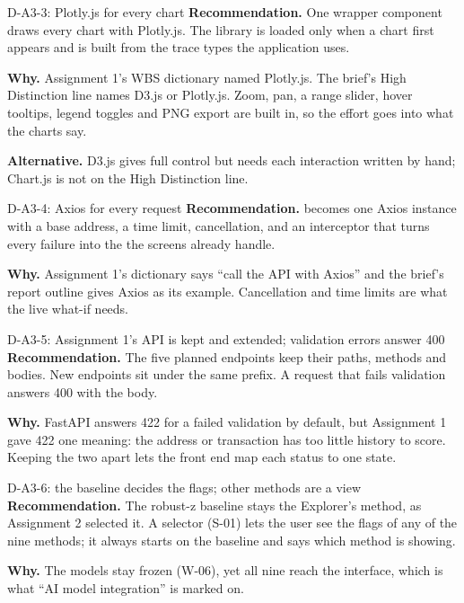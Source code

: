 \begin{decision}{D-A3-3: Plotly.js for every chart}
\textbf{Recommendation.} One wrapper component draws every chart with Plotly.js. The library is
loaded only when a chart first appears and is built from the trace types the application uses.

\textbf{Why.} Assignment 1's WBS dictionary named Plotly.js. The brief's High Distinction line
names D3.js or Plotly.js. Zoom, pan, a range slider, hover tooltips, legend toggles and PNG export
are built in, so the effort goes into what the charts say.

\textbf{Alternative.} D3.js gives full control but needs each interaction written by hand;
Chart.js is not on the High Distinction line.
\end{decision}

\begin{decision}{D-A3-4: Axios for every request}
\textbf{Recommendation.}  becomes one Axios instance with a base address, a
time limit, cancellation, and an interceptor that turns every failure into the  the
screens already handle.

\textbf{Why.} Assignment 1's dictionary says ``call the API with Axios'' and the brief's report
outline gives Axios as its example. Cancellation and time limits are what the live what-if needs.
\end{decision}

\begin{decision}{D-A3-5: Assignment 1's API is kept and extended; validation errors answer 400}
\textbf{Recommendation.} The five planned endpoints keep their paths, methods and bodies. New
endpoints sit under the same  prefix. A request that fails validation answers 400 with
the  body.

\textbf{Why.} FastAPI answers 422 for a failed validation by default, but Assignment 1 gave 422
one meaning: the address or transaction has too little history to score. Keeping the two apart lets
the front end map each status to one state.
\end{decision}

\begin{decision}{D-A3-6: the baseline decides the flags; other methods are a view}
\textbf{Recommendation.} The robust-z baseline stays the Explorer's method, as Assignment 2
selected it. A selector (S-01) lets the user see the flags of any of the nine methods; it always
starts on the baseline and says which method is showing.

\textbf{Why.} The models stay frozen (W-06), yet all nine reach the interface, which is what
``AI model integration'' is marked on.
\end{decision}

